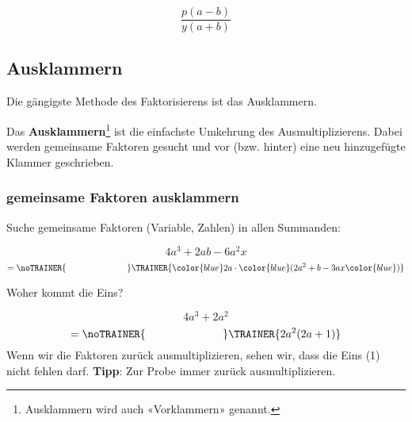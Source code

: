 $$\frac{p(a-b)}{y(a+b)}$$

\newpage

\subsection{Ausklammern}
Die gängigste Methode des Faktorisierens ist das Ausklammern.

Das \textbf{Ausklammern}\footnote{Ausklammern wird auch «Vorklammern» genannt.} ist die einfachste Umkehrung des Ausmultiplizierens.
Dabei werden gemeinsame Faktoren gesucht und vor (bzw. hinter) eine
neu hinzugefügte Klammer geschrieben.

\subsubsection{gemeinsame Faktoren ausklammern}
Suche gemeinsame Faktoren (Variable, Zahlen) in allen Summanden:

\begin{beispiel}{}{}
  $$4a^3 + 2ab -6a^2x$$
  $$=\noTRAINER{\hspace{7em}}\TRAINER{ {\color{blue}2a}\cdot{\color{blue}(}2a^2+b -3ax{\color{blue})}}$$
\end{beispiel}

\begin{beispiel}{Woher kommt die Eins?}{}

$$4a^3 + 2a^2$$
$$=\noTRAINER{\hspace{7em}}\TRAINER{2a^2(2a + 1)}$$
Wenn wir die Faktoren zurück ausmultiplizieren, sehen wir, dass die
Eins (1) nicht fehlen darf. \textbf{Tipp}: Zur Probe immer zurück ausmultiplizieren.
\end{beispiel}




\newcommand{\olatAB}[2]{\subsection*{Aufgaben}
\aufgabenFarbe{OLAT #1. Aufg. #2}
\platzFuerBerechnungenBisEndeSeite{}}






